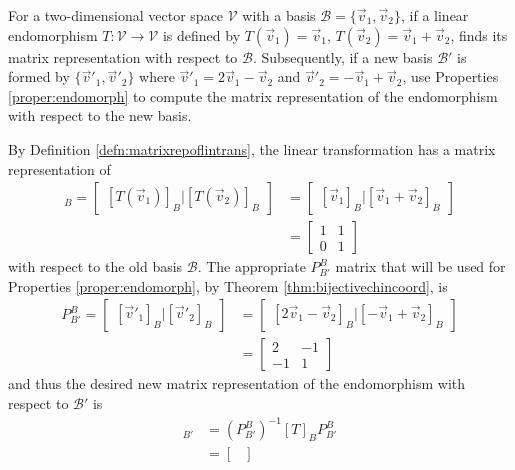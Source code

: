 \begin{exmp}
\label{exmp:endomorphch}
For a two-dimensional vector space $\mathcal{V}$ with a basis $\mathcal{B} = \{\vec{v}_1, \vec{v}_2\}$, if a linear endomorphism $T: \mathcal{V} \to \mathcal{V}$ is defined by $T(\vec{v}_1) = \vec{v}_1$, $T(\vec{v}_2) = \vec{v}_1 + \vec{v}_2$, finds its matrix representation with respect to $\mathcal{B}$. Subsequently, if a new basis $\mathcal{B}'$ is formed by $\{\vec{v}'_1, \vec{v}'_2\}$ where $\vec{v}'_1 = 2\vec{v}_1 - \vec{v}_2$ and $\vec{v}'_2 = -\vec{v}_1 + \vec{v}_2$, use Properties \ref{proper:endomorph} to compute the matrix representation of the endomorphism with respect to the new basis.
\end{exmp}
\begin{solution}
By Definition \ref{defn:matrixrepoflintrans}, the linear transformation has a matrix representation of
\begin{align*}
[T]_B = \begin{bmatrix}
[T(\vec{v}_1)]_B|[T(\vec{v}_2)]_B    
\end{bmatrix} &= 
\begin{bmatrix}
[\vec{v}_1]_B|[\vec{v}_1 + \vec{v}_2]_B    
\end{bmatrix} \\
&=
\begin{bmatrix}
1 & 1 \\
0 & 1
\end{bmatrix}
\end{align*}
with respect to the old basis $\mathcal{B}$. The appropriate $P_{B'}^B$ matrix that will be used for Properties \ref{proper:endomorph}, by Theorem \ref{thm:bijectivechincoord}, is
\begin{align*}
P_{B'}^B = 
\begin{bmatrix}
[\vec{v}'_1]_B|[\vec{v}'_2]_B
\end{bmatrix}
&= \begin{bmatrix}
[2\vec{v}_1 - \vec{v}_2]_B|[-\vec{v}_1 + \vec{v}_2]_B
\end{bmatrix} \\
&=
\begin{bmatrix}
2 & -1 \\
-1 & 1
\end{bmatrix}
\end{align*}
and thus the desired new matrix representation of the endomorphism with respect to $\mathcal{B}'$ is
\begin{align*}
[T]_{B'} &= (P_{B'}^B)^{-1} [T]_B P_{B'}^B \\
&= 
\begin{bmatrix}

\end{bmatrix}
\end{align*}
\end{solution}
